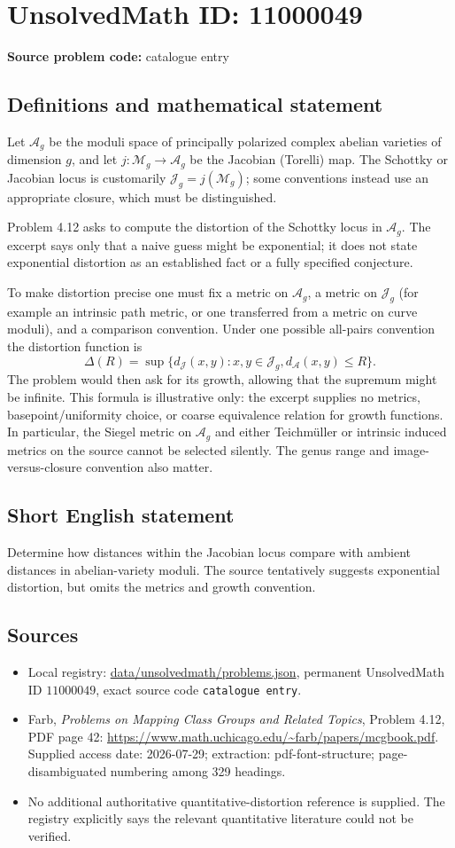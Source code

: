 \documentclass[11pt]{article}
\begin{document}
\section*{UnsolvedMath ID: 11000049}
\textbf{Source problem code:} catalogue entry
\subsection{Definitions and mathematical statement}
Let $\mathcal A_g$ be the moduli space of principally polarized complex abelian varieties of dimension $g$, and let $j:\mathcal M_g\to\mathcal A_g$ be the Jacobian (Torelli) map. The Schottky or Jacobian locus is customarily $\mathcal J_g=j(\mathcal M_g)$; some conventions instead use an appropriate closure, which must be distinguished.

Problem 4.12 asks to compute the distortion of the Schottky locus in $\mathcal A_g$. The excerpt says only that a naive guess might be exponential; it does not state exponential distortion as an established fact or a fully specified conjecture.

To make distortion precise one must fix a metric on $\mathcal A_g$, a metric on $\mathcal J_g$ (for example an intrinsic path metric, or one transferred from a metric on curve moduli), and a comparison convention. Under one possible all-pairs convention the distortion function is
\[
 \Delta(R)=\sup\{d_{\mathcal J}(x,y):x,y\in\mathcal J_g,
 d_{\mathcal A}(x,y)\leq R\}.
\]
The problem would then ask for its growth, allowing that the supremum might be infinite. This formula is illustrative only: the excerpt supplies no metrics, basepoint/uniformity choice, or coarse equivalence relation for growth functions. In particular, the Siegel metric on $\mathcal A_g$ and either Teichm\"uller or intrinsic induced metrics on the source cannot be selected silently. The genus range and image-versus-closure convention also matter.
\subsection{Short English statement}
Determine how distances within the Jacobian locus compare with ambient distances in abelian-variety moduli. The source tentatively suggests exponential distortion, but omits the metrics and growth convention.
\subsection{Sources}
\begin{itemize}
\item Local registry: \url{data/unsolvedmath/problems.json}, permanent UnsolvedMath ID $11000049$, exact source code \texttt{catalogue entry}.
\item Farb, \emph{Problems on Mapping Class Groups and Related Topics}, Problem 4.12, PDF page 42: \url{https://www.math.uchicago.edu/~farb/papers/mcgbook.pdf}. Supplied access date: 2026-07-29; extraction: pdf-font-structure; page-disambiguated numbering among 329 headings.
\item No additional authoritative quantitative-distortion reference is supplied. The registry explicitly says the relevant quantitative literature could not be verified.
\end{itemize}
\end{document}
